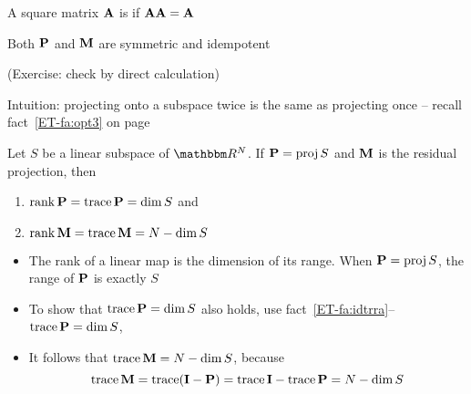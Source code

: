 \begin{frame}
    
    \vspace{2em}
    A square matrix $\mathbf A$ is  if $\mathbf A \mathbf A = \mathbf A$ 
    
    \vspace{.7em}
    \Fact{\eqref{ET-fa:pmsi}}
        Both $\mathbf P$ and $\mathbf M$ are symmetric and idempotent
    
    (Exercise: check by direct calculation)
    
    \vspace{.7em}
    Intuition: projecting
    onto a subspace twice is the same as projecting once -- recall fact~\ref{ET-fa:opt3} on page~\pageref{ET-fa:opt3}
    
\end{frame}

\begin{frame}
    
    \vspace{2em}
    \Fact{\eqref{ET-fa:trop}}
    Let $S$ be a linear subspace of $\RR^N$. If $\mathbf P = \operatorname{proj} S$ and 
    $\mathbf M$ is the residual projection, then 
    \begin{enumerate}
        \item $\operatorname{rank} \mathbf P  = \operatorname{trace} \mathbf P  = \dim S$ and
        \item $\operatorname{rank} \mathbf M  = \operatorname{trace} \mathbf M  = N - \dim S$
    \end{enumerate}
  
  
    \Prf
    \begin{itemize}
        \item The rank of a linear
            map is the dimension of its range.  When $\mathbf P = \operatorname{proj} S$, the range of
            $\mathbf P$ is exactly $S$
        \item To show that $\operatorname{trace} \mathbf P = \dim S$ also holds, use
                fact~\ref{ET-fa:idtrra}--  $\operatorname{trace}\mathbf P
                = \dim S$, 
        \item It follows that $\operatorname{trace}\mathbf M = N - \dim S$, because
            \begin{equation*}
                \operatorname{trace}\mathbf M 
                = \operatorname{trace}(\mathbf I - \mathbf P) 
                = \operatorname{trace} \mathbf I - \operatorname{trace}\mathbf P 
                = N - \dim S
            \end{equation*}

    \end{itemize}
  
\end{frame}



